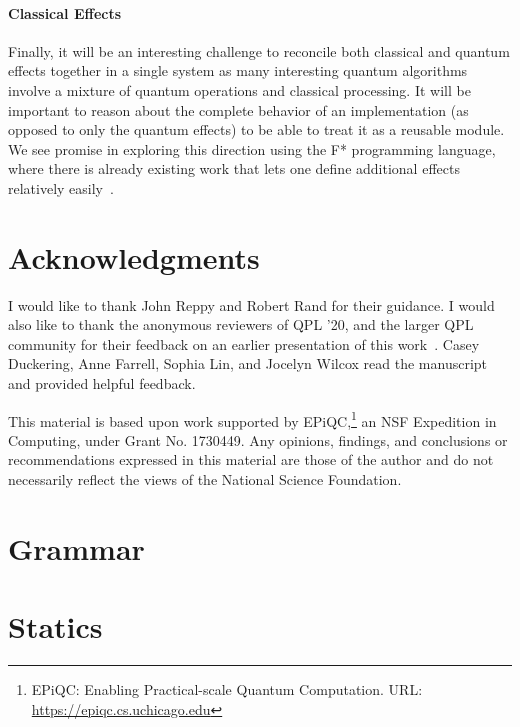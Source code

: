 \paragraph{Classical Effects} Finally, it will be an interesting challenge to reconcile both classical and quantum effects together in a single system as many interesting quantum algorithms involve a mixture of quantum operations and classical processing. It will be important to reason about the complete behavior of an implementation (as opposed to only the quantum effects) to be able to treat it as a reusable module. We see promise in exploring this direction using the F* programming language, where there is already existing work that lets one define additional effects relatively easily~\parencite{dm4free2017}.

\section*{Acknowledgments}
I would like to thank John Reppy and Robert Rand for their guidance. I would also like to thank the anonymous reviewers of QPL '20, and the larger QPL community for their feedback on an earlier presentation of this work~\parencite{qhtt20}. Casey Duckering, Anne Farrell, Sophia Lin, and Jocelyn Wilcox read the manuscript and provided helpful feedback.

This material is based upon work supported by EPiQC,\footnote{EPiQC: Enabling Practical-scale Quantum Computation. {\scriptsize URL:} \url{https://epiqc.cs.uchicago.edu}} an NSF Expedition in Computing, under Grant No. 1730449. Any opinions, findings, and conclusions or recommendations expressed in this material are those
of the author and do not necessarily reflect the views of the National Science Foundation.

\printbibliography[heading=bibintoc]

\appendix

\section{Grammar}
\label{app:grammar}


\section{Statics}
\label{app:rules}

